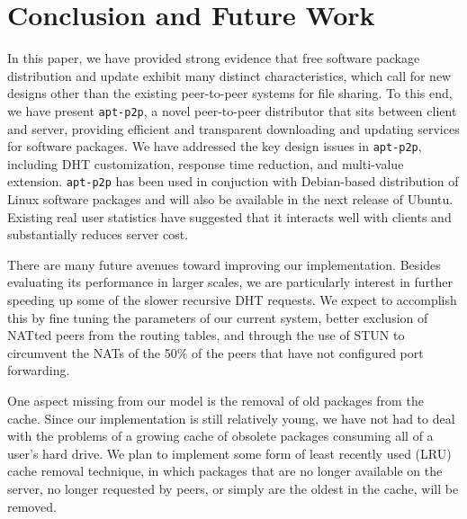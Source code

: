 \documentclass[conference]{IEEEtran}
\begin{document}

\section{Conclusion and Future Work}
\label{conclusions}

In this paper, we have provided strong evidence that free software package distribution 
and update exhibit many distinct characteristics, which call for new designs other
than the existing peer-to-peer systems for file sharing. To this end, we have 
present \texttt{apt-p2p}, a novel peer-to-peer distributor that sits between
client and server, providing efficient and transparent downloading and updating services
for software packages. We have addressed the key design issues in \texttt{apt-p2p}, including DHT customization,
response time reduction, and multi-value extension. \texttt{apt-p2p}  has been used in conjuction with Debian-based distribution of Linux
software packages and will also be available in the next release of Ubuntu. Existing real user statistics
have suggested that it interacts well with clients and substantially reduces server cost. 

There are many future avenues toward improving our implementation. Besides 
evaluating its performance in larger scales, we are particularly interest in further speeding up some of the slower recursive
DHT requests. We expect to accomplish this by fine tuning the
parameters of our current system, better exclusion of NATted peers
from the routing tables, and through the use of STUN \cite{STUN} to
circumvent the NATs of the 50\% of the peers that have not
configured port forwarding.

One aspect missing from our model is the removal of old packages
from the cache. Since our implementation is still relatively young,
we have not had to deal with the problems of a growing cache of
obsolete packages consuming all of a user's hard drive. We plan to
implement some form of least recently used (LRU) cache removal
technique, in which packages that are no longer available on the
server, no longer requested by peers, or simply are the oldest in
the cache, will be removed.





\end{document}
